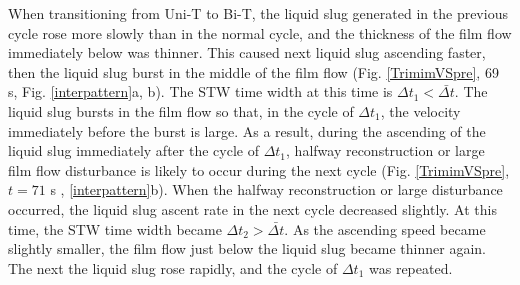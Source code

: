 \documentclass[aps,pre,preprint,groupedaddress,showkeys]{revtex4-2}
\begin{document}
When transitioning from Uni-T to Bi-T, the liquid slug generated in the previous cycle rose more slowly than in the normal cycle, and the thickness of the film flow immediately below was thinner.
This caused next liquid slug ascending faster, then the liquid slug burst in the middle of the film flow (Fig. \ref{TrimimVSpre}, 69 s, Fig. \ref{interpattern}a, b).
The STW time width at this time is $ \Delta t_ {1} <\bar {\Delta t} $.
The liquid slug bursts in the film flow so that, in the cycle of $ \Delta t_ {1} $, the velocity immediately before the burst is large.
As a result, during the ascending of the liquid slug immediately after the cycle of $ \Delta t_ {1} $, halfway reconstruction or large film flow disturbance is likely to occur during the next cycle (Fig. \ref{TrimimVSpre}, $ t = 71 $ s , \ref{interpattern}b).
When the halfway reconstruction or large disturbance occurred, the liquid slug ascent rate in the next cycle decreased slightly.
At this time, the STW time width became $ \Delta t_ {2}> \bar{\Delta t} $. 
As the ascending speed became slightly smaller, the film flow just below the liquid slug became thinner again.
The next the liquid slug rose rapidly, and the cycle of $ \Delta t_ {1} $ was repeated.
\end{document}

